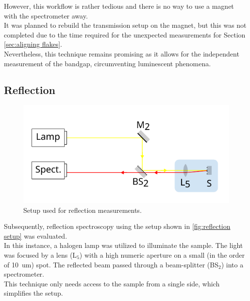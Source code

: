 \documentclass[
	twoside,
	parskip=half,
	a4paper,
]{scrbook}
\begin{document}
However, this workflow is rather tedious and there is no way to use a magnet with the spectrometer away.\\
It was planned to rebuild the transmission setup on the magnet, but this was not completed due to the time required for the unexpected measurements for Section \ref{sec:aligning flakes}.\\
Nevertheless, this technique remains promising as it allows for the independent measurement of the bandgap, circumventing luminescent phenomena.

\clearpage
\subsection{Reflection}
\begin{figure}
	\centering
	\includegraphics{../figures/setup_reflection.pdf}
	\caption{Setup used for reflection measurements.}
	\label{fig:reflection setup}
\end{figure}
Subsequently, reflection spectroscopy using the setup shown in \autoref{fig:reflection setup} was evaluated.\\
In this instance, a halogen lamp was utilized to illuminate the sample.
The light was focused by a lens (L$_5$) with a high numeric aperture on a small (in the order of \SI{10}{um}) spot.
The reflected beam passed through a beam-splitter (BS$_2$) into a spectrometer.\\
This technique only needs access to the sample from a single side, which simplifies the setup.
\end{document}
